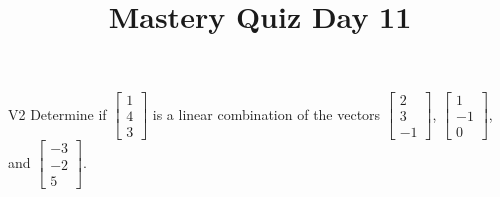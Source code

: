 \documentclass{sbgLAquiz}
\title{Mastery Quiz Day 11 }
\begin{document}
\begin{problem}{V2}
Determine if $\begin{bmatrix} 1 \\ 4 \\ 3 \end{bmatrix}$ is a linear combination of the vectors $\begin{bmatrix} 2 \\ 3 \\ -1 \end{bmatrix}$, $\begin{bmatrix} 1 \\ -1 \\ 0 \end{bmatrix}$, and $\begin{bmatrix} -3 \\ -2 \\ 5 \end{bmatrix}$.
\end{problem}
\end{document}
